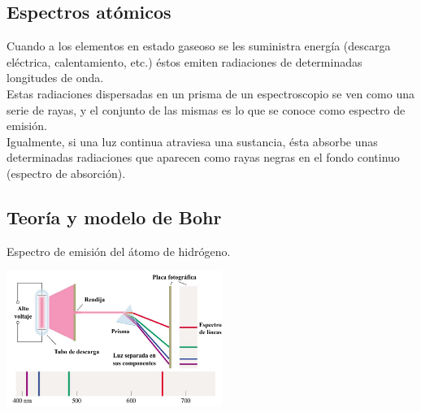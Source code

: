     \subsection{Espectros atómicos}
        \indent Cuando a los elementos en estado gaseoso se les suministra energía (descarga eléctrica, calentamiento, etc.) éstos emiten radiaciones de determinadas longitudes de onda. \\
        \indent Estas radiaciones dispersadas en un prisma de un espectroscopio se ven como una serie de rayas, y el conjunto de las mismas es lo que se conoce como espectro de emisión. \\
        \indent Igualmente, si una luz continua atraviesa una sustancia, ésta absorbe unas determinadas radiaciones que aparecen como rayas negras en el fondo continuo (espectro de absorción). \\

    \subsection{Teoría y modelo de Bohr}
        \indent Espectro de emisión del átomo de hidrógeno.
        \begin{center} \includegraphics[width=7cm]{./imagenes/espectroEmisionHidrogeno.png} \end{center}
        
